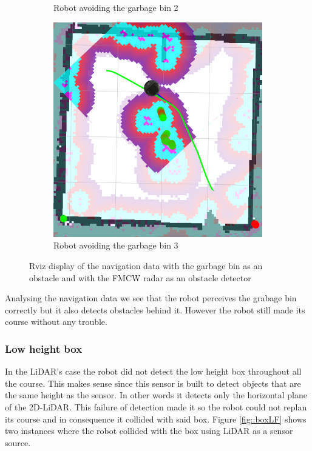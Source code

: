 \begin{figure}[ht!]
\begin{subfigure}[t]{0.3\linewidth}
    \caption{Robot avoiding the garbage bin 2}
    \label{fig::rvizgarbageradar2}
  \end{subfigure}
   \begin{subfigure}[t]{0.3\linewidth}
    \includegraphics[width=\linewidth]{imgs/chapter5/rvizgarbageradar2.png}
    \caption{Robot avoiding the garbage bin 3}
    \label{fig::rvizgarbageradar3}
  \end{subfigure}
  \caption[Navigation data with the garbage bin as an obstacle with \ac{FMCW} \ac{radar}]{Rviz display of the navigation data with the garbage bin as an obstacle and with the \ac{FMCW} \ac{radar} as an obstacle detector}
  \label{fig:rvizgarbageradar}
\end{figure}
Analysing the navigation data we see that the robot perceives the grabage bin correctly but it also detects obstacles behind it. However the robot still made its course without any trouble.
\subsubsection{Low height box}

In the LiDAR's case the robot did not detect the low height box throughout all the course. This makes sense since this sensor is built to detect objects that are the same height as the sensor. In other words it detects only the horizontal plane of the 2D-\ac{LiDAR}. This failure of detection made it so the robot could not replan its course and in consequence it collided with said box. Figure \ref{fig::boxLF} shows two instances where the robot collided with the box using \ac{LiDAR} as a sensor source.

